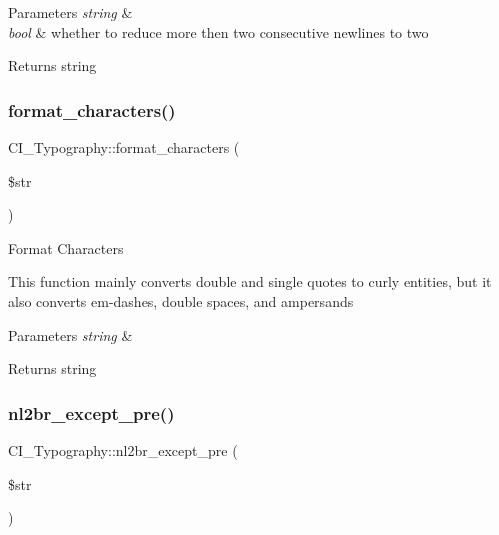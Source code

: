 \begin{DoxyParams}{Parameters}
{\em string} & \\
\hline
{\em bool} & whether to reduce more then two consecutive newlines to two \\
\hline
\end{DoxyParams}
\begin{DoxyReturn}{Returns}
string 
\end{DoxyReturn}
\mbox{\label{class_c_i___typography_adda8d4b7710214f638ed761a6e035fbc}} 
\subsubsection{\texorpdfstring{format\+\_\+characters()}{format\_characters()}}
{\footnotesize\ttfamily C\+I\+\_\+\+Typography\+::format\+\_\+characters (\begin{DoxyParamCaption}\item[{}]{\$str }\end{DoxyParamCaption})}

Format Characters

This function mainly converts double and single quotes to curly entities, but it also converts em-\/dashes, double spaces, and ampersands


\begin{DoxyParams}{Parameters}
{\em string} & \\
\hline
\end{DoxyParams}
\begin{DoxyReturn}{Returns}
string 
\end{DoxyReturn}
\mbox{\label{class_c_i___typography_a6c9560b1e1b7d2e290cb29c8df935f06}} 
\subsubsection{\texorpdfstring{nl2br\+\_\+except\+\_\+pre()}{nl2br\_except\_pre()}}
{\footnotesize\ttfamily C\+I\+\_\+\+Typography\+::nl2br\+\_\+except\+\_\+pre (\begin{DoxyParamCaption}\item[{}]{\$str }\end{DoxyParamCaption})}

